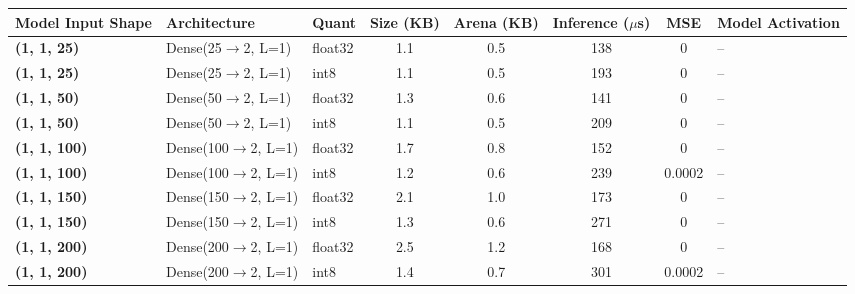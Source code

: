 \begin{tabular}{lllccccl}
\toprule
\textbf{Model Input Shape} & Architecture & Quant & Size (KB) & Arena (KB) & Inference ($\mu$s) & MSE & Model Activation \\
\midrule
\textbf{(1, 1, 25)} & Dense(25$\to$2, L=1) & float32 & 1.1 & 0.5 & 138 & 0 & -- \\
\textbf{(1, 1, 25)} & Dense(25$\to$2, L=1) & int8 & 1.1 & 0.5 & 193 & 0 & -- \\
\textbf{(1, 1, 50)} & Dense(50$\to$2, L=1) & float32 & 1.3 & 0.6 & 141 & 0 & -- \\
\textbf{(1, 1, 50)} & Dense(50$\to$2, L=1) & int8 & 1.1 & 0.5 & 209 & 0 & -- \\
\textbf{(1, 1, 100)} & Dense(100$\to$2, L=1) & float32 & 1.7 & 0.8 & 152 & 0 & -- \\
\textbf{(1, 1, 100)} & Dense(100$\to$2, L=1) & int8 & 1.2 & 0.6 & 239 & 0.0002 & -- \\
\textbf{(1, 1, 150)} & Dense(150$\to$2, L=1) & float32 & 2.1 & 1.0 & 173 & 0 & -- \\
\textbf{(1, 1, 150)} & Dense(150$\to$2, L=1) & int8 & 1.3 & 0.6 & 271 & 0 & -- \\
\textbf{(1, 1, 200)} & Dense(200$\to$2, L=1) & float32 & 2.5 & 1.2 & 168 & 0 & -- \\
\textbf{(1, 1, 200)} & Dense(200$\to$2, L=1) & int8 & 1.4 & 0.7 & 301 & 0.0002 & -- \\
\bottomrule
\end{tabular}
